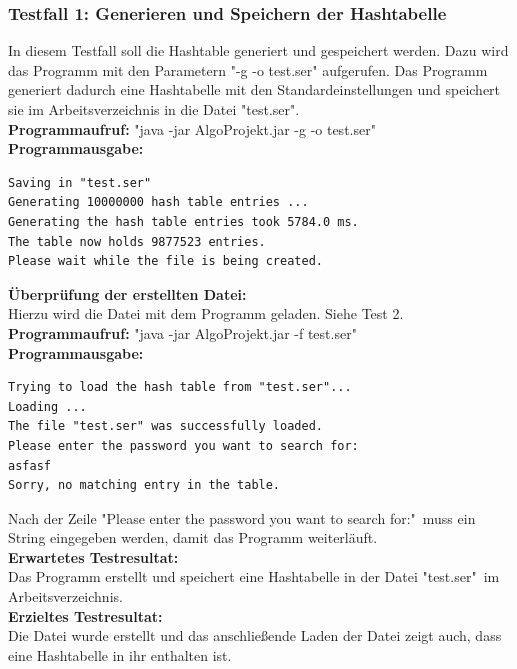 \documentclass[11pt]{article}
\begin{document}
  \subsubsection{Testfall 1: Generieren und Speichern der Hashtabelle}
    In diesem Testfall soll die Hashtable generiert und gespeichert werden. Dazu wird das Programm mit den Parametern "-g -o test.ser" aufgerufen. Das Programm generiert dadurch eine Hashtabelle mit den Standardeinstellungen und speichert sie im Arbeitsverzeichnis in die Datei "test.ser".\\
    \textbf{Programmaufruf:} "java -jar AlgoProjekt.jar -g -o test.ser"\\
    \textbf{Programmausgabe:}
    \begin{verbatim}
Saving in "test.ser"
Generating 10000000 hash table entries ...
Generating the hash table entries took 5784.0 ms.
The table now holds 9877523 entries.
Please wait while the file is being created.
    \end{verbatim}
    \textbf{Überprüfung der erstellten Datei:}\\
    Hierzu wird die Datei mit dem Programm geladen. Siehe Test 2.\\
    \textbf{Programmaufruf:}
    "java -jar AlgoProjekt.jar -f test.ser"\\
         \textbf{Programmausgabe:}
         \begin{verbatim}
Trying to load the hash table from "test.ser"...
Loading ...
The file "test.ser" was successfully loaded.
Please enter the password you want to search for: 
asfasf
Sorry, no matching entry in the table.
         \end{verbatim}
         Nach der Zeile "Please enter the password you want to search for:"\
         muss ein String eingegeben werden, damit das Programm weiterläuft.\\
         \textbf{Erwartetes Testresultat:}\\
Das Programm erstellt und speichert eine Hashtabelle in der Datei "test.ser"\ im Arbeitsverzeichnis.\\
\textbf{Erzieltes Testresultat:}\\
Die Datei wurde erstellt und das anschließende Laden der Datei zeigt auch, dass eine Hashtabelle in ihr enthalten ist.
\end{document}
